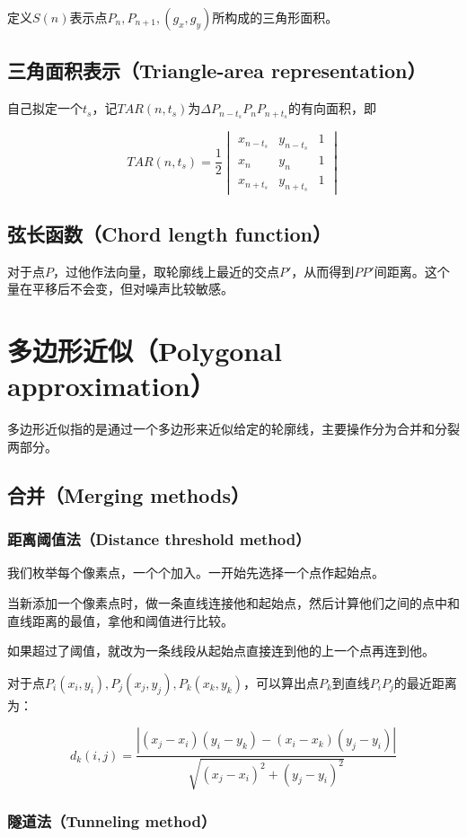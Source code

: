 \documentclass{ctexart}
\begin{document}
定义$S(n)$表示点$P_n,P_{n+1},(g_x,g_y)$所构成的三角形面积。

\subsection{三角面积表示（Triangle-area representation）}

自己拟定一个$t_s$，记$TAR(n,t_s)$为$\Delta P_{n-t_s}P_nP_{n+t_s}$的有向面积，即

\[TAR(n,t_s)=\frac{1}{2} \begin{vmatrix}x_{n-t_s} & y_{n-t_s} & 1\\x_n & y_n & 1 \\x_{n+t_s} & y_{n+t_s} & 1\end{vmatrix}\]

\subsection{弦长函数（Chord length function）}

对于点$P$，过他作法向量，取轮廓线上最近的交点$P'$，从而得到$PP'$间距离。这个量在平移后不会变，但对噪声比较敏感。

\section{多边形近似（Polygonal approximation）}
多边形近似指的是通过一个多边形来近似给定的轮廓线，主要操作分为合并和分裂两部分。
\subsection{合并（Merging methods）}
\subsubsection{距离阈值法（Distance threshold method）}

我们枚举每个像素点，一个个加入。一开始先选择一个点作起始点。

当新添加一个像素点时，做一条直线连接他和起始点，然后计算他们之间的点中和直线距离的最值，拿他和阈值进行比较。

如果超过了阈值，就改为一条线段从起始点直接连到他的上一个点再连到他。

对于点$P_i(x_i,y_i),P_j(x_j,y_j),P_k(x_k,y_k)$，可以算出点$P_k$到直线$P_iP_j$的最近距离为：

\[d_k(i,j)=\frac{|(x_j-x_i)(y_i-y_k)-(x_i-x_k)(y_j-y_i)|}{\sqrt{(x_j-x_i)^2+(y_j-y_i)^2}}\]

\subsubsection{隧道法（Tunneling method）}
\end{document}
